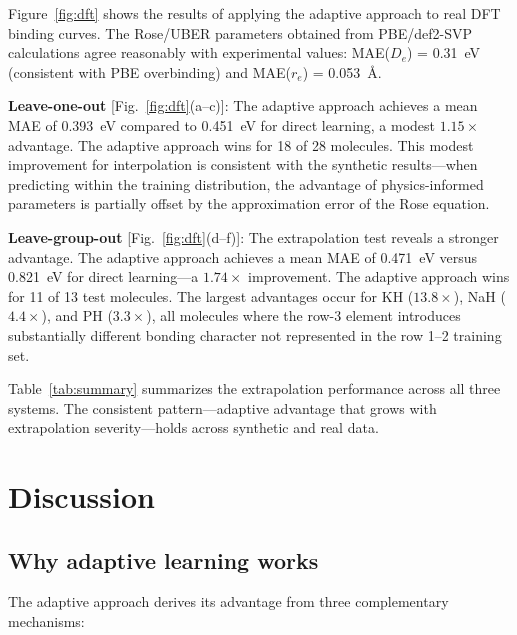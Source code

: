 \documentclass[aps,prb,twocolumn,superscriptaddress,longbibliography,floatfix]{revtex4-2}
\begin{document}
Figure~\ref{fig:dft} shows the results of applying the adaptive approach to real DFT binding curves. The Rose/UBER parameters obtained from PBE/def2-SVP calculations agree reasonably with experimental values: MAE($D_e$) = 0.31~eV (consistent with PBE overbinding) and MAE($r_e$) = 0.053~\AA.

\textbf{Leave-one-out} [Fig.~\ref{fig:dft}(a--c)]: The adaptive approach achieves a mean MAE of 0.393~eV compared to 0.451~eV for direct learning, a modest $1.15\times$ advantage. The adaptive approach wins for 18 of 28 molecules. This modest improvement for interpolation is consistent with the synthetic results---when predicting within the training distribution, the advantage of physics-informed parameters is partially offset by the approximation error of the Rose equation.

\textbf{Leave-group-out} [Fig.~\ref{fig:dft}(d--f)]: The extrapolation test reveals a stronger advantage. The adaptive approach achieves a mean MAE of 0.471~eV versus 0.821~eV for direct learning---a $1.74\times$ improvement. The adaptive approach wins for 11 of 13 test molecules. The largest advantages occur for KH ($13.8\times$), NaH ($4.4\times$), and PH ($3.3\times$), all molecules where the row-3 element introduces substantially different bonding character not represented in the row 1--2 training set.

Table~\ref{tab:summary} summarizes the extrapolation performance across all three systems. The consistent pattern---adaptive advantage that grows with extrapolation severity---holds across synthetic and real data.


\section{Discussion}
\label{sec:discussion}

\subsection{Why adaptive learning works}
\label{sec:why}

The adaptive approach derives its advantage from three complementary mechanisms:
\end{document}
